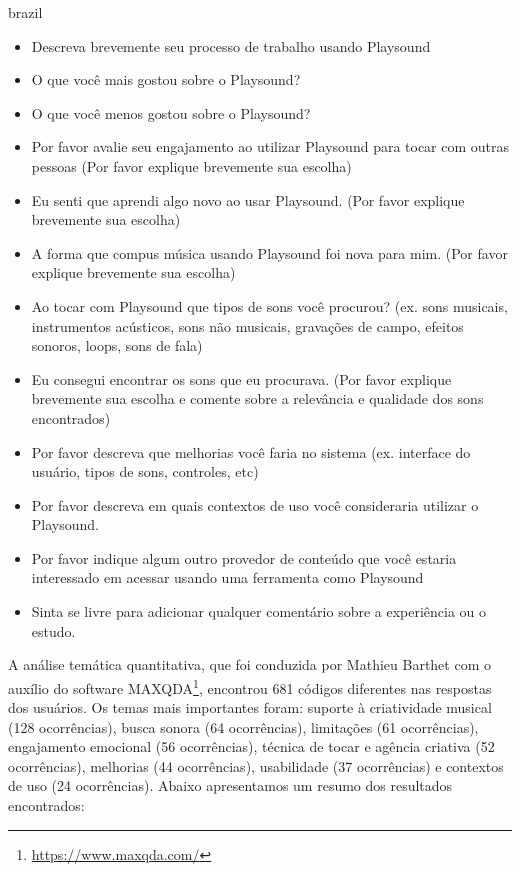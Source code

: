 \begin{otherlanguage*}{brazil}
\begin{itemize}
\item Descreva brevemente seu processo de trabalho usando Playsound

\item O que você mais gostou sobre o Playsound?

\item O que você menos gostou sobre o Playsound?

\item Por favor avalie seu engajamento ao utilizar Playsound para tocar com outras pessoas (Por favor explique brevemente sua escolha)

\item Eu senti que aprendi algo novo ao usar Playsound. (Por favor explique brevemente sua escolha)

\item A forma que compus música usando Playsound foi nova para mim. (Por favor explique brevemente sua escolha)

\item Ao tocar com Playsound que tipos de sons você procurou? (ex. sons musicais, instrumentos acústicos, sons não musicais, gravações de campo, efeitos sonoros, loops, sons de fala)

\item Eu consegui encontrar os sons que eu procurava. (Por favor explique brevemente sua escolha e comente sobre a relevância e qualidade dos sons encontrados)

\item Por favor descreva que melhorias você faria no sistema (ex. interface do usuário, tipos de sons, controles, etc)

\item Por favor descreva em quais contextos de uso você consideraria utilizar o Playsound.

\item Por favor indique algum outro provedor de conteúdo que você estaria interessado em acessar usando uma ferramenta como Playsound

\item Sinta se livre para adicionar qualquer comentário sobre a experiência ou o estudo.

\end{itemize}

A análise temática quantitativa, que foi conduzida por Mathieu Barthet com o auxílio do software MAXQDA\footnote{\url{https://www.maxqda.com/}}, encontrou 681 códigos diferentes nas respostas dos usuários. Os temas mais importantes foram: suporte à criatividade musical (128 ocorrências), busca sonora (64 ocorrências), limitações (61 ocorrências), engajamento emocional (56 ocorrências), técnica de tocar e agência criativa (52 ocorrências), melhorias (44 ocorrências), usabilidade (37 ocorrências) e contextos de uso (24 ocorrências). Abaixo apresentamos um resumo dos resultados encontrados:


\end{otherlanguage*}
